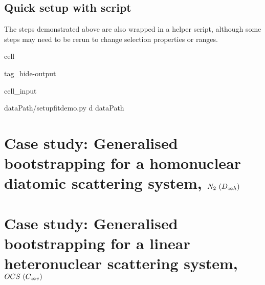 \documentclass[letterpaper,table,10pt,english]{jupyterBook}
\begin{document}
\section{Quick setup with script}
\label{\detokenize{part2/basic_fitting_numerics_intro_260423:quick-setup-with-script}}
\sphinxAtStartPar
The steps demonstrated above are also wrapped in a helper script, although some steps may need to be re\sphinxhyphen{}run to change selection properties or ranges.

\begin{sphinxuseclass}{cell}
\begin{sphinxuseclass}{tag_hide-output}\begin{sphinxVerbatimInput}

\begin{sphinxuseclass}{cell_input}
\begin{sphinxVerbatim}[commandchars=\\\{\}]
 \PYGZob{}dataPath/\PYGZdq{}setup\PYGZus{}fit\PYGZus{}demo.py\PYGZdq{}\PYGZcb{} \PYGZhy{}d \PYGZob{}dataPath\PYGZcb{}
\end{sphinxVerbatim}

\end{sphinxuseclass}\end{sphinxVerbatimInput}

\end{sphinxuseclass}
\end{sphinxuseclass}
\sphinxstepscope


\chapter{Case study: Generalised bootstrapping for a homonuclear diatomic scattering system, \protect\(N_2~(D_{\infty h})\protect\)}
\label{\detokenize{part2/case-study-N2_270423:case-study-generalised-bootstrapping-for-a-homonuclear-diatomic-scattering-system-n-2-d-infty-h}}\label{\detokenize{part2/case-study-N2_270423:chpt-n2-case-study}}\label{\detokenize{part2/case-study-N2_270423::doc}}
\sphinxstepscope


\chapter{Case study: Generalised bootstrapping for a linear heteronuclear scattering system, \protect\(OCS~(C_{\infty v})\protect\)}
\label{\detokenize{part2/case-study-OCS_270423:case-study-generalised-bootstrapping-for-a-linear-heteronuclear-scattering-system-ocs-c-infty-v}}\label{\detokenize{part2/case-study-OCS_270423:chpt-ocs-case-study}}\label{\detokenize{part2/case-study-OCS_270423::doc}}
\sphinxstepscope
\end{document}
